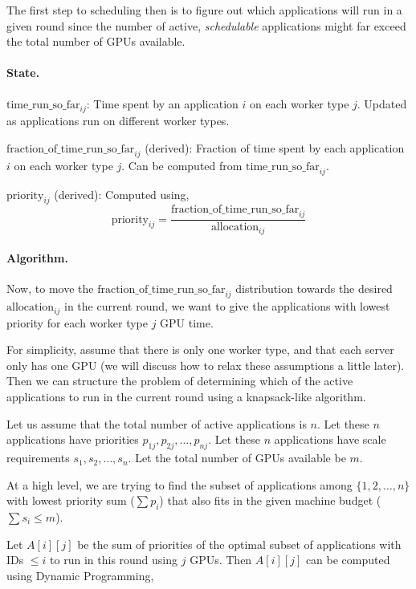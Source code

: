 \documentclass{article}
\begin{document}
The first step to scheduling then is to figure out which applications will run
in a given round since the number of active, \emph{schedulable} applications
might far exceed the total number of GPUs available.

\paragraph{State.} $\text{time\_run\_so\_far}_{ij}$: Time spent by an
application $i$ on each worker type $j$. Updated as applications run on different
worker types.

$\text{fraction\_of\_time\_run\_so\_far}_{ij}$ (derived): Fraction of time spent
by each application $i$ on each worker type $j$. Can be computed from $\text{time\_run\_so\_far}_{ij}$.

$\text{priority}_{ij}$ (derived): Computed using,
$$\text{priority}_{ij} = \dfrac{\text{fraction\_of\_time\_run\_so\_far}_{ij}}{\text{allocation}_{ij}}$$

\paragraph{Algorithm.} Now, to move the $\text{fraction\_of\_time\_run\_so\_far}_{ij}$
distribution towards the desired $\text{allocation}_{ij}$ in the current round,
we want to give the applications with lowest priority for each worker type $j$
GPU time.

For simplicity, assume that there is only one worker type, and that each server
only has one GPU (we will discuss how to relax these assumptions a little later).
Then we can structure the problem of determining which of the active applications
to run in the current round using a knapsack-like algorithm.

Let us assume that the total number of active applications is $n$. Let these
$n$ applications have priorities $p_{1j}, p_{2j}, \ldots, p_{nj}$. Let these $n$ applications
have scale requirements $s_1, s_2, \ldots, s_n$. Let the total number of GPUs
available be $m$.

At a high level, we are trying to find the subset of applications among $\{1, 2, \ldots, n\}$
with lowest priority sum ($\sum p_i$) that also fits in the given machine budget
($\sum s_i \leq m$).

Let $A[i][j]$ be the sum of priorities of the optimal subset of applications with
IDs $\leq i$ to run in this round using $j$ GPUs. Then $A[i][j]$ can be
computed using Dynamic Programming,
\end{document}
